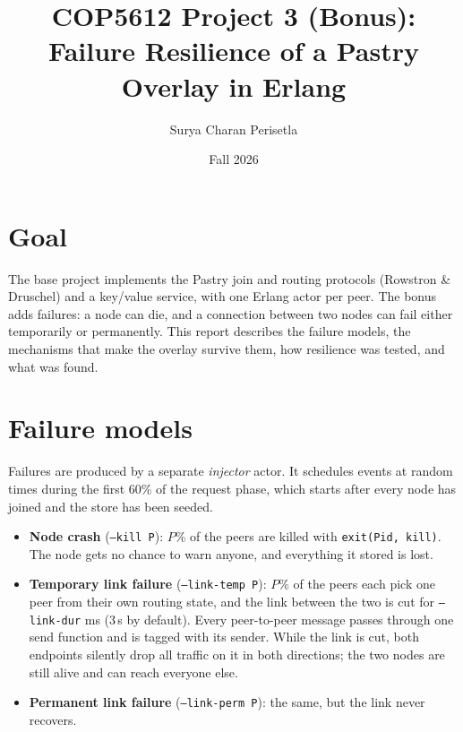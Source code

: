 \documentclass[10pt]{article}
\title{\textbf{COP5612 Project 3 (Bonus): Failure Resilience of a Pastry Overlay in Erlang}}
\author{Surya Charan Perisetla}
\date{Fall 2026}
\begin{document}
\maketitle

\section{Goal}
The base project implements the Pastry join and routing protocols (Rowstron \& Druschel) and a key/value service, with one Erlang actor per peer.
The bonus adds failures: a node can die, and a connection between two nodes can fail either temporarily or permanently.
This report describes the failure models, the mechanisms that make the overlay survive them, how resilience was tested, and what was found.

\section{Failure models}
Failures are produced by a separate \emph{injector} actor.
It schedules events at random times during the first 60\% of the request phase, which starts after every node has joined and the store has been seeded.
\begin{itemize}
  \item \textbf{Node crash} (\texttt{--kill P}): $P\%$ of the peers are killed with \texttt{exit(Pid, kill)}.
  The node gets no chance to warn anyone, and everything it stored is lost.
  \item \textbf{Temporary link failure} (\texttt{--link-temp P}): $P\%$ of the peers each pick one peer from their own routing state, and the link between the two is cut for \texttt{--link-dur} ms (3\,s by default).
  Every peer-to-peer message passes through one send function and is tagged with its sender.
  While the link is cut, both endpoints silently drop all traffic on it in both directions; the two nodes are still alive and can reach everyone else.
  \item \textbf{Permanent link failure} (\texttt{--link-perm P}): the same, but the link never recovers.
\end{itemize}
\end{document}

